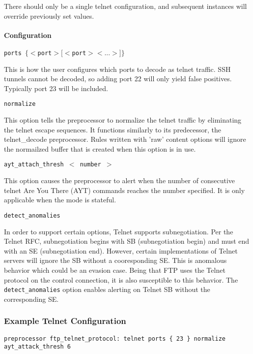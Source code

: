 \documentclass[english]{report}
\newcounter{slistnum}
\newenvironment{slist}
{ \begin{list}{ {\bf \arabic{slistnum}.} }{\usecounter{slistnum} } }
{ \end{list} }
\begin{document}
There should  only be a single telnet configuration, and subsequent instances
will override previously set values.

\paragraph{Configuration}
\begin{slist}
\item \texttt{ports $\{ <$port$> [<$port$> <...>] \}$}

This is how the user configures which ports to decode as telnet traffic.
SSH tunnels cannot be decoded, so adding port 22 will only yield false
positives.  Typically port 23 will be included.

\item \texttt{normalize}

This option tells the preprocessor to normalize the telnet traffic
by eliminating the telnet escape sequences.  It functions similarly
to its predecessor, the telnet\_decode preprocessor.  Rules written
with 'raw' content options will ignore the normailzed buffer that
is created when this option is in use.

\item \texttt{ayt\_attach\_thresh $<$ number $>$}

This option causes the preprocessor to alert when the number of consecutive
telnet Are You There (AYT) commands reaches the number specified.  It
is only applicable when the mode is stateful.

\item \texttt{detect\_anomalies}

In order to support certain options, Telnet supports subnegotiation. Per the
Telnet RFC, subnegotiation begins with SB (subnegotiation begin) and must
end with an SE (subnegotiation end). However, certain implementations of
Telnet servers will ignore the SB without a cooresponding SE. This is
anomalous behavior which could be an evasion case. Being that FTP uses the
Telnet protocol on the control connection, it is also susceptible to this
behavior. The \texttt{detect\_anomalies} option enables alerting on Telnet SB without
the corresponding SE.

\end{slist}

\subsubsection{Example Telnet Configuration}
\begin{verbatim}
preprocessor ftp_telnet_protocol: telnet ports { 23 } normalize ayt_attack_thresh 6
\end{verbatim}
\end{document}
